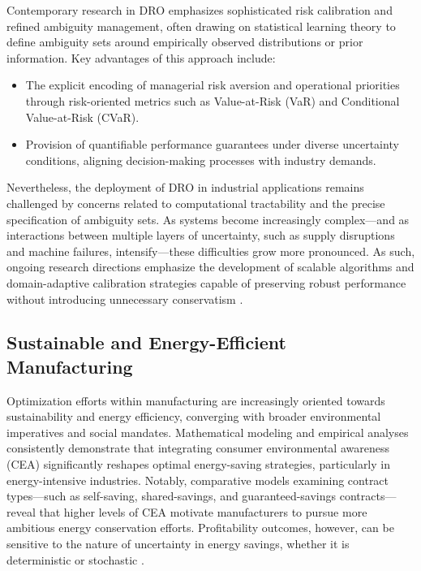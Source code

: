 \documentclass[sigconf]{acmart}
\begin{document}
Contemporary research in DRO emphasizes sophisticated risk calibration and refined ambiguity management, often drawing on statistical learning theory to define ambiguity sets around empirically observed distributions or prior information. Key advantages of this approach include:

\begin{itemize}
    \item The explicit encoding of managerial risk aversion and operational priorities through risk-oriented metrics such as Value-at-Risk (VaR) and Conditional Value-at-Risk (CVaR).
    \item Provision of quantifiable performance guarantees under diverse uncertainty conditions, aligning decision-making processes with industry demands.
\end{itemize}

Nevertheless, the deployment of DRO in industrial applications remains challenged by concerns related to computational tractability and the precise specification of ambiguity sets. As systems become increasingly complex—and as interactions between multiple layers of uncertainty, such as supply disruptions and machine failures, intensify—these difficulties grow more pronounced. As such, ongoing research directions emphasize the development of scalable algorithms and domain-adaptive calibration strategies capable of preserving robust performance without introducing unnecessary conservatism \cite{ref77}.

\subsection{Sustainable and Energy-Efficient Manufacturing}

Optimization efforts within manufacturing are increasingly oriented towards sustainability and energy efficiency, converging with broader environmental imperatives and social mandates. Mathematical modeling and empirical analyses consistently demonstrate that integrating consumer environmental awareness (CEA) significantly reshapes optimal energy-saving strategies, particularly in energy-intensive industries. Notably, comparative models examining contract types—such as self-saving, shared-savings, and guaranteed-savings contracts—reveal that higher levels of CEA motivate manufacturers to pursue more ambitious energy conservation efforts. Profitability outcomes, however, can be sensitive to the nature of uncertainty in energy savings, whether it is deterministic or stochastic \cite{ref80}.
\end{document}
